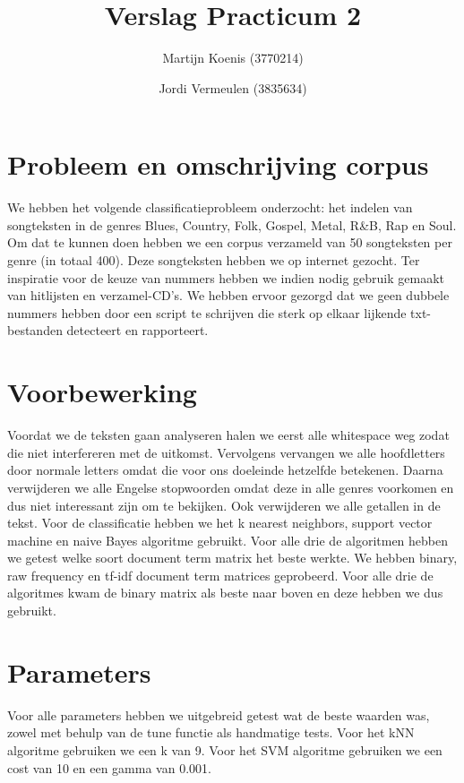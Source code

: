 \documentclass[a4paper,oneside]{article}
\begin{document}
\title{Verslag Practicum 2}
\author{Martijn Koenis (3770214) \and Jordi Vermeulen (3835634)}
\date{}
\maketitle
\tabulinesep=1.2mm

\section{Probleem en omschrijving corpus}
We hebben het volgende classificatieprobleem onderzocht: het indelen van songteksten in de genres Blues, Country, Folk, Gospel, Metal, R\&B, Rap en Soul.  Om dat te kunnen doen hebben we een corpus verzameld van 50 songteksten per genre (in totaal 400). Deze songteksten hebben we op internet gezocht. Ter inspiratie voor de keuze van nummers hebben we indien nodig gebruik gemaakt van hitlijsten en verzamel-CD's. We hebben ervoor gezorgd dat we geen dubbele nummers hebben door een script te schrijven die sterk op elkaar lijkende txt-bestanden detecteert en rapporteert.

\section{Voorbewerking}
Voordat we de teksten gaan analyseren halen we eerst alle whitespace weg zodat die niet interfereren met de uitkomst. Vervolgens vervangen we alle hoofdletters door normale letters omdat die voor ons doeleinde hetzelfde betekenen. Daarna verwijderen we alle Engelse stopwoorden omdat deze in alle genres voorkomen en dus niet interessant zijn om te bekijken. Ook verwijderen we alle getallen in de tekst. Voor de classificatie hebben we het k nearest neighbors, support vector machine en naive Bayes algoritme gebruikt. Voor alle drie de algoritmen hebben we getest welke soort document term matrix het beste werkte. We hebben binary, raw frequency en tf-idf document term matrices geprobeerd. Voor alle drie de algoritmes kwam de binary matrix als beste naar boven en deze hebben we dus gebruikt.

\section{Parameters}
Voor alle parameters hebben we uitgebreid getest wat de beste waarden was, zowel met behulp van de tune functie als handmatige tests. Voor het kNN algoritme gebruiken we een k van 9. Voor het SVM algoritme gebruiken we een cost van 10 en een gamma van 0.001.
\end{document}
